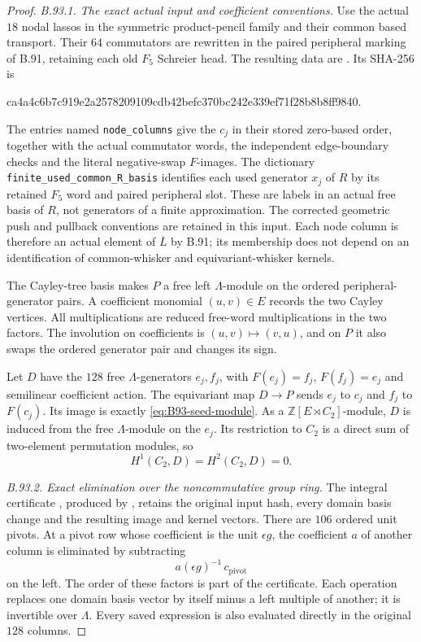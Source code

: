 \begin{proof}
\emph{B.93.1. The exact actual input and coefficient conventions.}
Use the actual $18$ nodal lassos in the symmetric product-pencil
family and their common based transport. Their $64$ commutators
are rewritten in the paired peripheral marking of B.91, retaining
each old $F_5$ Schreier head. The resulting data are
.
Its SHA-256 is
\begin{center}\small\ttfamily
ca4a4c6b7c919e2a2578209109cdb42befc370bc242e339ef71f28b8b8ff9840.
\end{center}
The entries named \texttt{node\_columns} give the $c_j$ in their
stored zero-based order, together with the actual commutator words,
the independent edge-boundary checks and the literal negative-swap
$F$-images. The dictionary \texttt{finite\_used\_common\_R\_basis}
identifies each used generator $x_j$ of $R$ by its retained $F_5$
word and paired peripheral slot. These are labels in an actual
free basis of $R$, not generators of a finite approximation.
The corrected geometric push and pullback conventions are retained
in this input. Each node column is therefore an actual element of
$\overline L$ by B.91; its membership does not depend on an
identification of common-whisker and equivariant-whisker kernels.

The Cayley-tree basis makes $P$ a free left $\Lambda$-module on
the ordered peripheral-generator pairs. A coefficient monomial
$(u,v)\in E$ records the two Cayley vertices. All multiplications
are reduced free-word multiplications in the two factors. The
involution on coefficients is $(u,v)\mapsto(v,u)$, and on $P$ it
also swaps the ordered generator pair and changes its sign.

Let $D$ have the $128$ free $\Lambda$-generators $e_j,f_j$,
with $F(e_j)=f_j$, $F(f_j)=e_j$ and semilinear coefficient action.
The equivariant map $D\to P$ sends $e_j$ to $c_j$ and $f_j$ to
$F(c_j)$. Its image is exactly \eqref{eq:B93-seed-module}.
As a $\mathbb Z[E\rtimes C_2]$-module, $D$ is induced from
the free $\Lambda$-module on the $e_j$. Its restriction to $C_2$
is a direct sum of two-element permutation modules, so
\begin{equation}\label{eq:B93-domain-acyclic}
                         H^1(C_2,D)=H^2(C_2,D)=0.
\end{equation}

\emph{B.93.2. Exact elimination over the noncommutative group ring.}
The integral certificate
, produced by
, retains the original
input hash, every domain basis change and the resulting image
and kernel vectors. There are $106$ ordered unit pivots. At a
pivot row whose coefficient is the unit $\epsilon g$, the
coefficient $a$ of another column is eliminated by subtracting
\[
                         a(\epsilon g)^{-1}\,c_{\mathrm{pivot}}
\]
on the left. The order of these factors is part of the certificate.
Each operation replaces one domain basis vector by itself minus
a left multiple of another; it is invertible over $\Lambda$.
Every saved expression is also evaluated directly in the original
$128$ columns.


\end{proof}
